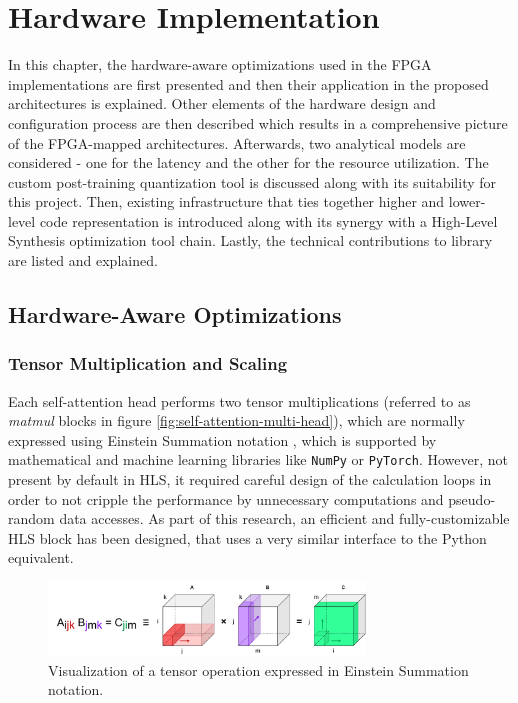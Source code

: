 \chapter{Hardware Implementation}\label{quantization}
In this chapter, the hardware-aware optimizations used in the FPGA implementations are first presented and then their application in the proposed architectures is explained. Other elements of the hardware design and configuration process are then described which results in a comprehensive picture of the FPGA-mapped architectures. Afterwards, two analytical models are considered - one for the latency and the other for the resource utilization. The custom post-training quantization tool is discussed along with its suitability for this project. Then, existing infrastructure that ties together higher and lower-level code representation is introduced along with its synergy with a High-Level Synthesis optimization tool chain. Lastly, the technical contributions to \hlsml library are listed and explained.

\section{Hardware-Aware Optimizations}

\subsection{Tensor Multiplication and Scaling}
Each self-attention head performs two tensor multiplications (referred to as \textit{matmul} blocks in figure \ref{fig:self-attention-multi-head}), which are normally expressed using Einstein Summation notation \cite{59-barr1991einstein}, which is supported by mathematical and machine learning libraries like \texttt{NumPy} or \texttt{PyTorch}. However, not present by default in HLS, it required careful design of the calculation loops in order to not cripple the performance by unnecessary computations and pseudo-random data accesses. As part of this research, an efficient and fully-customizable HLS block has been designed, that uses a very similar interface to the Python equivalent.

\begin{figure}[hpt!]
  \centering
  \includegraphics[trim={0cm 0cm 0cm 0cm}, width=0.75\textwidth, center]{models/einsum.pdf}
  \caption{Visualization of a tensor operation expressed in Einstein Summation notation.}
  \label{fig:einsum}
\end{figure}


